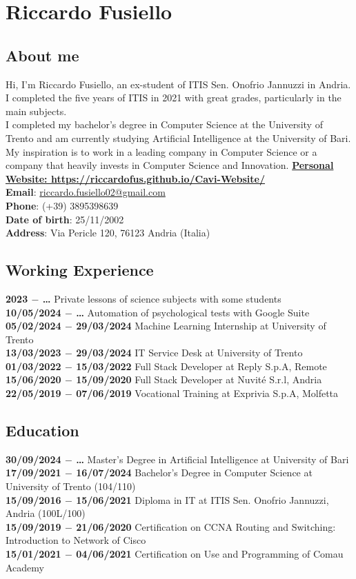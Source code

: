 \documentclass[12pt]{article}
\begin{document}
\section*{Riccardo Fusiello}\subsection*{About me}
Hi, I'm Riccardo Fusiello, an ex-student of ITIS Sen. Onofrio Jannuzzi in Andria. I completed the five years of ITIS in 2021 with great grades, particularly in the main subjects.\\
I completed my bachelor's degree in Computer Science at the University of Trento and am currently studying Artificial Intelligence at the University of Bari. My inspiration is to work in a leading company in Computer Science or a company that heavily invests in Computer Science and Innovation.
\href{https://riccardofus.github.io/Cavi-Website/}{\textbf{Personal Website: https://riccardofus.github.io/Cavi-Website/}}\\
\textbf{Email}: \href{mailto:riccardo.fusiello02@gmail.com}{riccardo.fusiello02@gmail.com}\\
\textbf{Phone}: (+39) 3895398639\\
\textbf{Date of birth}: 25/11/2002\\
\textbf{Address}: Via Pericle 120, 76123 Andria (Italia)
\subsection*{Working Experience}
\textbf{2023 $-$ \dots} Private lessons of science subjects with some students\\
\textbf{10/05/2024 $-$ \dots} Automation of psychological tests with Google Suite\\
\textbf{05/02/2024 $-$ 29/03/2024} Machine Learning Internship at University of Trento\\
\textbf{13/03/2023 $-$ 29/03/2024} IT Service Desk at University of Trento\\
\textbf{01/03/2022 $-$ 15/03/2022} Full Stack Developer at Reply S.p.A, Remote\\
\textbf{15/06/2020 $-$ 15/09/2020} Full Stack Developer at Nuvité S.r.l, Andria \\
\textbf{22/05/2019 $-$ 07/06/2019} Vocational Training at Exprivia S.p.A, Molfetta
\subsection*{Education}
\textbf{30/09/2024 $-$ \dots} Master's Degree in Artificial Intelligence at University of Bari\\
\textbf{17/09/2021 $-$ 16/07/2024} Bachelor's Degree in Computer Science at University of Trento (104/110)\\
\textbf{15/09/2016 $-$ 15/06/2021} Diploma in IT at ITIS Sen. Onofrio Jannuzzi, Andria (100L/100)\\
\textbf{15/09/2019 $-$ 21/06/2020} Certification on CCNA Routing and Switching: Introduction to Network of Cisco\\
\textbf{15/01/2021 $-$ 04/06/2021} Certification on Use and Programming of Comau Academy
\end{document}
